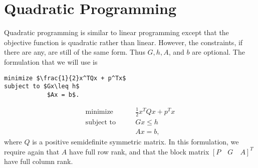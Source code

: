 \begin{comment}
>>> h = matrix([-7., -2., -4., -5., -8.,  0., 0., 0., 0., 0., 0.,])
>>> o = matrix([4., 7., 6., 8., 8., 9])
>>> sol = glpk.ilp(o,G,h)
>>> print sol[1]
\end{lstlisting}

or
\begin{lstlisting}
>>> from cvxopt import matrix, solvers, glpk
>>> G = matrix([ [-1., 0., 0., 0., 0., 0.],
             [0., -1., 0., 0., 0., 0.],
             [0., 0., -1., 0., 0., 0.],
             [0., 0., 0., -1., 0., 0.],
             [0., 0., 0., 0., -1., 0.],
             [0., 0., 0., 0., 0., -1.] ])

>>> h = matrix([ 0., 0., 0., 0., 0., 0.,])
>>> o = matrix([4., 7., 6., 8., 8., 9])
>>> A = matrix([ [1., 0., 0., 1., 0.],
             [1., 0., 0., 0., 1.],
             [0., 1., 0., 1., 0.],
             [0., 1., 0., 0., 1.],
             [0., 0., 1., 1., 0.],
             [0., 0., 1., 0., 1.] ])
>>> b = matrix([7., 2., 4., 5., 8])
>>> sol = glpk.ilp(o,G,h,A,b)
>>> print sol[1]
\end{lstlisting}

\textbf{Problem 2}
Choose one of these methods and compare the optimal values for the integer linear program to the result you received above.

\textbf{Problem 3}
Create the dual problem for the linear program and solve.
Compare your answer to the dual value cvxopt returned.
\end{comment}

\section*{Quadratic Programming}

Quadratic programming is similar to linear programming except that the objective function is quadratic rather
than linear. However, the constraints, if there are any, are still of the same form.
Thus $G, h, A$, and $b$ are optional. The formulation that we will use is
\begin{lstlisting}[mathescape]
minimize $\frac{1}{2}x^TQx + p^Tx$
subject to $Gx\leq h$
	        $Ax = b$.
\end{lstlisting}
\begin{align*}
\text{minimize}\qquad &\frac{1}{2}x^TQx + p^Tx \\
\text{subject to}\qquad &Gx \leq h\\
 &Ax = b,
\end{align*}
where $Q$ is a positive semidefinite symmetric matrix.
In this formulation, we require again that $A$ have full row rank, and that the block matrix
$[P \quad G \quad A]^T$ have full column rank.

